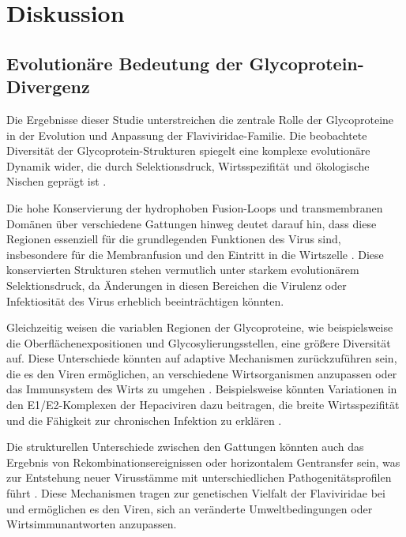 \chapter{Diskussion} \label{chap:diskussion}

\section{Evolutionäre Bedeutung der Glycoprotein-Divergenz} \label{sec:evolutionaere-bedeutung-der-glycoprotein-divergenz}

Die Ergebnisse dieser Studie unterstreichen die zentrale Rolle der Glycoproteine in der Evolution und Anpassung der Flaviviridae-Familie. Die beobachtete Diversität der Glycoprotein-Strukturen spiegelt eine komplexe evolutionäre Dynamik wider, die durch Selektionsdruck, Wirtsspezifität und ökologische Nischen geprägt ist \autocite{mifsudMappingGlycoproteinStructure2024}.

Die hohe Konservierung der hydrophoben Fusion-Loops und transmembranen Domänen über verschiedene Gattungen hinweg deutet darauf hin, dass diese Regionen essenziell für die grundlegenden Funktionen des Virus sind, insbesondere für die Membranfusion und den Eintritt in die Wirtszelle \autocite{Rey1995} \autocite{Modis2004}. Diese konservierten Strukturen stehen vermutlich unter starkem evolutionärem Selektionsdruck, da Änderungen in diesen Bereichen die Virulenz oder Infektiosität des Virus erheblich beeinträchtigen könnten.

Gleichzeitig weisen die variablen Regionen der Glycoproteine, wie beispielsweise die Oberflächenexpositionen und Glycosylierungsstellen, eine größere Diversität auf. Diese Unterschiede könnten auf adaptive Mechanismen zurückzuführen sein, die es den Viren ermöglichen, an verschiedene Wirtsorganismen anzupassen oder das Immunsystem des Wirts zu umgehen \autocite{Lavie2017}. Beispielsweise könnten Variationen in den E1/E2-Komplexen der Hepaciviren dazu beitragen, die breite Wirtsspezifität und die Fähigkeit zur chronischen Infektion zu erklären \autocite{Vieyres2013}.

Die strukturellen Unterschiede zwischen den Gattungen könnten auch das Ergebnis von Rekombinationsereignissen oder horizontalem Gentransfer sein, was zur Entstehung neuer Virusstämme mit unterschiedlichen Pathogenitätsprofilen führt \autocite{Weaver2009}. Diese Mechanismen tragen zur genetischen Vielfalt der Flaviviridae bei und ermöglichen es den Viren, sich an veränderte Umweltbedingungen oder Wirtsimmunantworten anzupassen.

